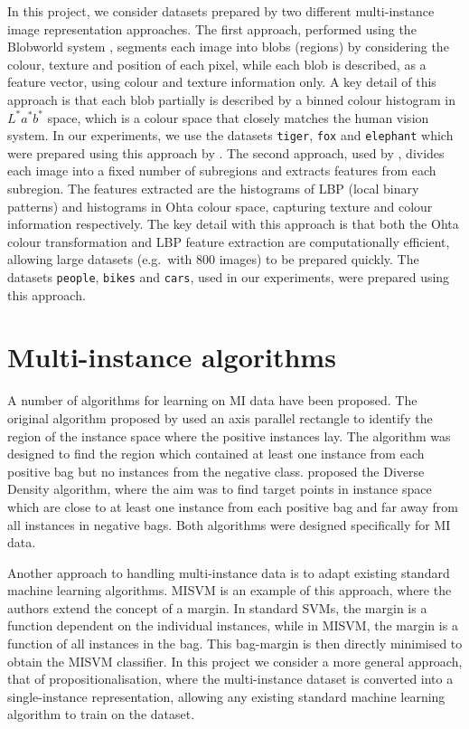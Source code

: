 \documentclass[a4paper,12pt]{report} %
\newcommand{\tdsTG}{\texttt{tiger}\xspace}
\newcommand{\tdsFX}{\texttt{fox}\xspace}
\newcommand{\tdsEL}{\texttt{elephant}\xspace}
\newcommand{\tdsPP}{\texttt{people}\xspace}
\newcommand{\tdsBK}{\texttt{bikes}\xspace}
\newcommand{\tdsCA}{\texttt{cars}\xspace}
\begin{document}
In this project, we consider datasets prepared by two different multi-instance image representation approaches.
The first approach, performed using the Blobworld system \cite{blobworld},
	segments each image into blobs (regions) by considering the colour, texture and position of each pixel, 
	while each blob is described, as a feature vector, using colour and texture information only.
A key detail of this approach is that each blob partially is described by a binned colour histogram 
	in $L^*a^*b^*$ space, which is a colour space that closely matches the human vision system.
In our experiments, we use the datasets \tdsTG, \tdsFX and \tdsEL 
	which were prepared using this approach by .
The second approach, used by , 
	divides each image into a fixed number of subregions and extracts 
	features from each subregion.
The features extracted are the histograms of LBP (local binary patterns) and histograms in Ohta colour space, 
	capturing texture and colour information respectively.
The key detail with this approach is that both the Ohta colour transformation and
	LBP feature extraction are computationally efficient, 
	allowing large datasets (e.g.\ with 800 images) to be prepared quickly.
The datasets \tdsPP, \tdsBK and \tdsCA, used in our experiments, were prepared using this approach.
    
\section{Multi-instance algorithms}
\label{sec:bg:algo}

A number of algorithms for learning on MI data have been proposed.
The original algorithm proposed by  
    used an axis parallel rectangle to identify the region of the instance space 
    where the positive instances lay. 
The algorithm was designed to find the region which 
    contained at least one instance from each positive bag 
    but no instances from the negative class. 
 proposed the Diverse Density algorithm, 
    where the aim was to find target points in instance space 
    which are close to at least one instance from each positive bag and 
    far away from all instances in negative bags.
Both algorithms were designed specifically for MI data.

Another approach to handling multi-instance data is to 
    adapt existing standard machine learning algorithms.
MISVM \cite{misvm} is an example of this approach, 
	where the authors extend the concept of a margin.
In standard SVMs, the margin is a function dependent on the individual instances, 
	while in MISVM, the margin is a function of all instances in the bag.
This bag-margin is then directly minimised to obtain the MISVM classifier.	
In this project we consider a more general approach, that of propositionalisation,
	where the multi-instance dataset is converted into a single-instance representation,
    allowing any existing standard machine learning algorithm to train on the dataset.
\end{document}
